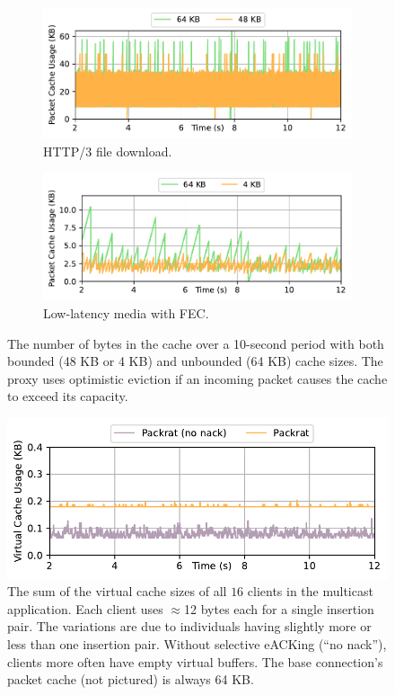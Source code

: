 \begin{figure}[t]
    \centering
    \begin{subfigure}[b]{0.8\linewidth}
        \centering
        \includegraphics[width=\linewidth]{figures/cache_http.pdf}
        \caption{HTTP/3 file download.
        }
        \label{fig:memory:http}
    \end{subfigure}
    \begin{subfigure}[b]{0.8\linewidth}
        \centering
        \includegraphics[width=\linewidth]{figures/cache_media.pdf}
        \caption{Low-latency media with FEC.}
        \label{fig:memory:media}
    \end{subfigure}
    \caption{\small The number of bytes in the cache over a
     10-second period with both bounded (48 KB or 4 KB) and unbounded (64 KB)
     cache sizes. The proxy uses optimistic eviction if an incoming packet
     causes the cache to exceed its capacity.}
    \label{fig:memory}
\end{figure}

\begin{figure}[t]
    \centering
    \includegraphics[width=0.8\linewidth]{figures/cache_multicast.pdf}
    \caption{The sum of the virtual cache sizes of all $16$ clients in
     the multicast application. Each client uses $\approx\!$12 bytes each for a
     single insertion pair. The variations are due to individuals having
     slightly more or less than one insertion pair. Without selective eACKing
     (``no nack''), clients more often have empty virtual buffers. The base
     connection's packet cache (not pictured) is always 64 KB.}
    \label{fig:memory:multicast}
\end{figure}
